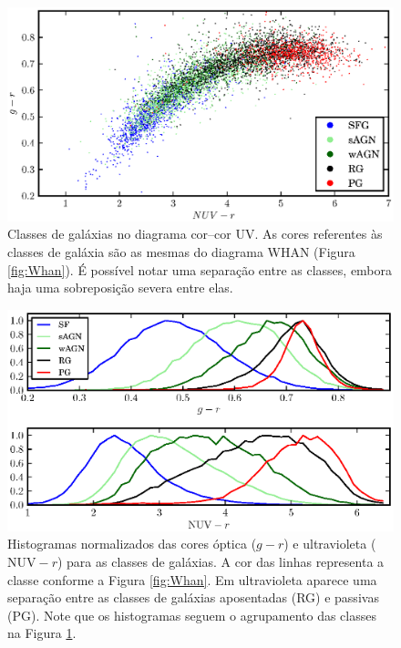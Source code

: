 \begin{figure}
	\includegraphics{figuras/uvcolor-color-class.eps}
	\caption[Diagrama cor--cor UV de acordo com o tipo de galáxia.]
	{Classes de galáxias no diagrama cor--cor UV. As cores referentes às classes de
	galáxia são as mesmas do diagrama WHAN (Figura \ref{fig:Whan}). É possível
	notar uma separação entre as classes, embora haja uma sobreposição severa
	entre elas.}
	\label{fig:ColorClass}
\end{figure}

\begin{figure}
	\includegraphics{figuras/histo_galtype_color.eps}
	\caption[Histogramas de cores para as classes de galáxias.]
	{Histogramas normalizados das cores óptica ($g-r$) e ultravioleta
	($\mathrm{NUV}-r$) para as classes de galáxias. A cor das linhas representa a
	classe conforme a Figura \ref{fig:Whan}. Em ultravioleta aparece uma separação
	entre as classes de galáxias aposentadas (RG) e passivas (PG). Note que os
	histogramas seguem o agrupamento das classes na Figura
	\ref{fig:ColorClass}.}
	\label{fig:HistogramaCorClasse}
\end{figure}


